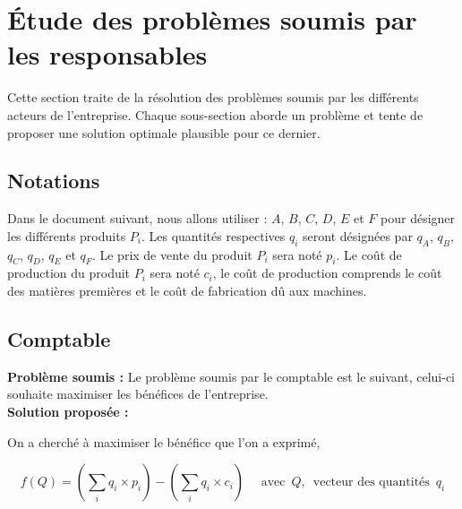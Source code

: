 \documentclass[paper=a4, fontsize=11pt]{scrartcl}
\numberwithin{equation}{section}		%
\numberwithin{figure}{section}			%
\numberwithin{table}{section}				%
\renewcommand{\bf}[1]{\textbf{#1}}
\begin{document}


\tableofcontents
\newpage

\section{\'Etude des problèmes soumis par les responsables}
Cette section traite de la résolution des problèmes soumis par les différents acteurs de l'entreprise. Chaque sous-section aborde un problème et tente de proposer une solution optimale plausible pour ce dernier.

\subsection*{Notations}

Dans le document suivant, nous allons utiliser : 
$A$, $B$, $C$, $D$, $E$ et $F$ pour désigner les différents produits $P_i$. Les quantités respectives $q_i$ seront désignées par $q_A$, $q_B$, $q_C$, $q_D$, $q_E$ et $q_F$. Le prix de vente du produit $P_i$ sera noté $p_i$. Le coût de production du produit $P_i$ sera noté $c_i$, le coût de production comprends le coût des matières premières et le coût de fabrication dû aux machines.

\subsection{Comptable}
\bf{Problème soumis :}
Le problème soumis par le comptable est le suivant, celui-ci souhaite maximiser les bénéfices de l'entreprise.\\

\bf{Solution proposée :}

On a cherché à maximiser le bénéfice que l'on a exprimé, 

\[f(Q) = (\sum_i q_i \times p_i ) - (\sum_i q_i \times c_i) \quad \text{  avec } \, Q, \, \text{ vecteur des quantités } \, q_i \]
\end{document}
